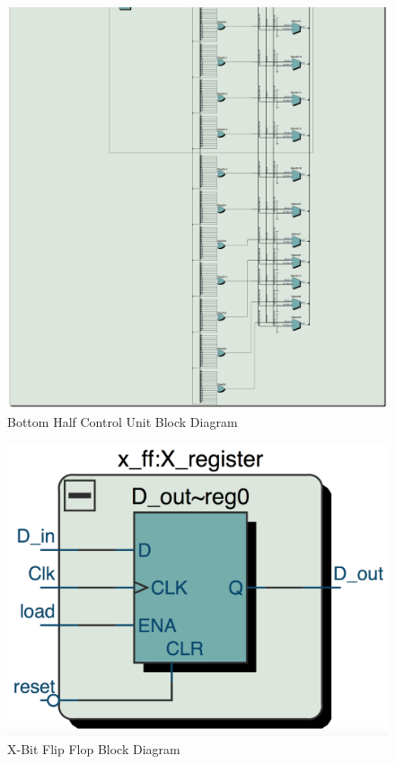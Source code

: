 \documentclass[journal, twocolumn, final,11pt,letterpaper]{IEEEtran}
\begin{document}
\begin{figure} [htbp]
	\centering
	\includegraphics[scale=0.65]{control-unit-bottom-half-diagram.png}
	\caption{Bottom Half Control Unit Block Diagram\label{fig:bottom-half-control}}
\end{figure}

\begin{figure} [htbp]
	\centering
	\includegraphics[scale=0.4]{x-ff-diagram.png}
	\caption{X-Bit Flip Flop Block Diagram\label{fig:x-ff-diagram}}
\end{figure}





\end{document}
